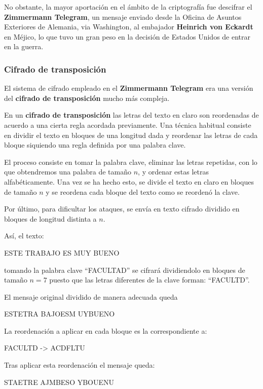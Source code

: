 \documentclass[nochap]{apuntesURJC}
\begin{document}
No obstante, la mayor aportación en el ámbito de la criptografía fue descifrar el \textbf{Zimmermann Telegram}, un mensaje enviado desde la Oficina de Asuntos Exteriores de Alemania, via Washington, al embajador \textbf{Heinrich von Eckardt} en Méjico, lo que tuvo un gran peso en la decisión de Estados Unidos de entrar en la guerra.

\subsubsection{Cifrado de transposición}
El sistema de cifrado empleado en el \textbf{Zimmermann Telegram} era una versión del \textbf{cifrado de transposición} mucho más compleja.

En un \textbf{cifrado de transposición} las letras del texto en claro son reordenadas de acuerdo a una cierta regla acordada previamente. Una técnica habitual consiste en dividir el texto en bloques de una longitud dada y reordenar las letras de cada bloque siquiendo una regla definida por una palabra clave.

El proceso consiste en tomar la palabra clave, eliminar las letras repetidas, con lo que obtendremos una palabra de tamaño $n$, y ordenar estas letras alfabéticamente. Una vez se ha hecho esto, se divide el texto en claro en bloques de tamaño $n$ y se reordena cada bloque del texto como se reordenó la clave.

Por último, para dificultar los ataques, se envía en texto cifrado dividido en bloques de longitud distinta a $n$.

Así, el texto:
\begin{center}
ESTE TRABAJO ES MUY BUENO
\end{center}
tomando la palabra clave ``FACULTAD'' se cifrará dividiendolo en bloques de tamaño $n=7$ puesto que las letras diferentes de la clave forman: ``FACULTD''.

El mensaje original dividido de manera adecuada queda
\begin{center}
ESTETRA BAJOESM UYBUENO
\end{center}

La reordenación a aplicar en cada bloque es la correspondiente a:
\begin{center}
FACULTD -> ACDFLTU
\end{center}

Tras aplicar esta reordenación el mensaje queda:
\begin{center}
STAETRE AJMBESO YBOUENU
\end{center}
\end{document}
